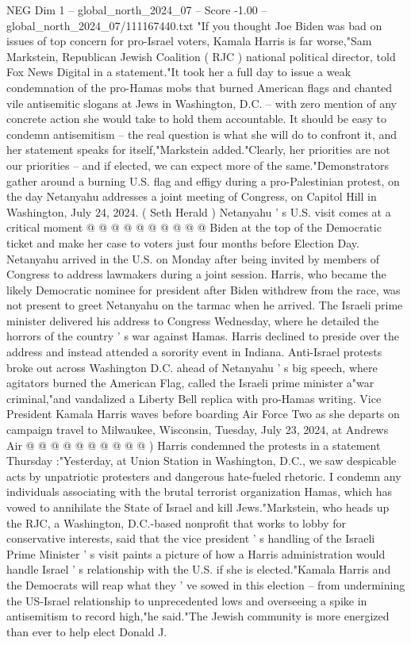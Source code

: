 \begin{textsample}{NEG Dim 1 – global\_north\_2024\_07 – Score -1.00 – global\_north\_2024\_07/111167440.txt}  \label{ex:f1_neg_060}
"If you thought Joe Biden was bad on issues of top concern for pro-Israel voters, Kamala Harris is far worse,"Sam Markstein, Republican Jewish Coalition ( RJC ) national political director, told Fox News Digital in a statement."It took her a full day to issue a weak condemnation of the pro-Hamas mobs that burned American flags and chanted vile antisemitic slogans at Jews in Washington, D.C. -- with zero mention of any concrete action she would take to hold them accountable.
It should be easy to condemn antisemitism -- the real question is what she will do to confront it, and her statement speaks for itself,"Markstein added."Clearly, her priorities are not our priorities -- and if elected, we can expect more of the same."Demonstrators gather around a burning U.S. flag and effigy during a pro-Palestinian protest, on the day Netanyahu addresses a joint meeting of Congress, on Capitol Hill in Washington, July 24, 2024. ( Seth Herald ) Netanyahu ' s U.S. visit comes at a critical moment @ @ @ @ @ @ @ @ @ @ Biden at the top of the Democratic ticket and make her case to voters just four months before Election Day.
Netanyahu arrived in the U.S. on Monday after being invited by members of Congress to address lawmakers during a joint session.
Harris, who became the likely Democratic nominee for president after Biden withdrew from the race, was not present to greet Netanyahu on the tarmac when he arrived.
The Israeli prime minister delivered his address to Congress Wednesday, where he detailed the horrors of the country ' s war against Hamas.
Harris declined to preside over the address and instead attended a sorority event in Indiana.
Anti-Israel protests broke out across Washington D.C. ahead of Netanyahu ' s big speech, where agitators burned the American Flag, called the Israeli prime minister a"war criminal,"and vandalized a Liberty Bell replica with pro-Hamas writing.
Vice President Kamala Harris waves before boarding Air Force Two as she departs on campaign travel to Milwaukee, Wisconsin, Tuesday, July 23, 2024, at Andrews Air @ @ @ @ @ @ @ @ @ @ ) Harris condemned the protests in a statement Thursday :"Yesterday, at Union Station in Washington, D.C., we saw despicable acts by unpatriotic protesters and dangerous hate-fueled rhetoric.
I condemn any individuals associating with the brutal terrorist organization Hamas, which has vowed to annihilate the State of Israel and kill Jews."Markstein, who heads up the RJC, a Washington, D.C.-based nonprofit that works to lobby for conservative interests, said that the vice president ' s handling of the Israeli Prime Minister ' s visit paints a picture of how a Harris administration would handle Israel ' s relationship with the U.S. if she is elected."Kamala Harris and the Democrats will reap what they ' ve sowed in this election -- from undermining the US-Israel relationship to unprecedented lows and overseeing a spike in antisemitism to record high,"he said."The Jewish community is more energized than ever to help elect Donald J.

\end{textsample}
